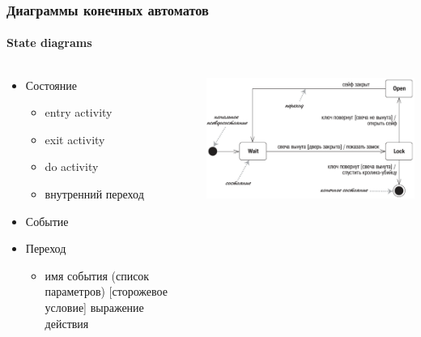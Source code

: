 \documentclass{../../slides-style}
\begin{document}
    \begin{frame}
        \frametitle{Диаграммы конечных автоматов}
        \framesubtitle{State diagrams}
        \begin{columns}
            \begin{column}{0.5\textwidth}
                \begin{itemize}
                    \item Состояние
                    \begin{itemize}
                        \item entry activity
                        \item exit activity
                        \item do activity
                        \item внутренний переход
                    \end{itemize}
                    \item Событие
                    \item Переход
                    \begin{itemize}
                        \item имя события (список параметров) [сторожевое условие] выражение действия
                    \end{itemize}
                \end{itemize}
            \end{column}
            \begin{column}{0.5\textwidth}
                \begin{center}
                    \includegraphics[width=\textwidth]{stateTransitionSyntax.png}
                \end{center}
            \end{column}
        \end{columns}
    \end{frame}
\end{document}
